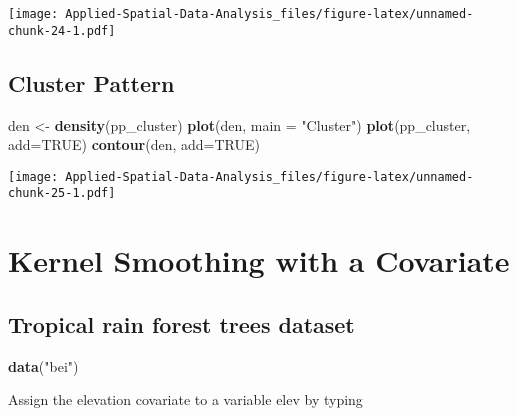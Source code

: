 \documentclass[
]{book}
\newenvironment{Shaded}{\begin{snugshade}}{\end{snugshade}}
\newcommand{\DataTypeTok}[1]{\textcolor[rgb]{0.13,0.29,0.53}{#1}}
\newcommand{\KeywordTok}[1]{\textcolor[rgb]{0.13,0.29,0.53}{\textbf{#1}}}
\newcommand{\NormalTok}[1]{#1}
\newcommand{\OperatorTok}[1]{\textcolor[rgb]{0.81,0.36,0.00}{\textbf{#1}}}
\newcommand{\OtherTok}[1]{\textcolor[rgb]{0.56,0.35,0.01}{#1}}
\newcommand{\StringTok}[1]{\textcolor[rgb]{0.31,0.60,0.02}{#1}}
\begin{document}
\texttt{[image: Applied-Spatial-Data-Analysis\_files/figure-latex/unnamed-chunk-24-1.pdf]}

\hypertarget{cluster-pattern}{%
\subsection{Cluster Pattern}\label{cluster-pattern}}

\begin{Shaded}
\begin{Highlighting}[]
\NormalTok{den <-}\StringTok{ }\KeywordTok{density}\NormalTok{(pp_cluster)}
\KeywordTok{plot}\NormalTok{(den, }\DataTypeTok{main =} \StringTok{"Cluster"}\NormalTok{)}
\KeywordTok{plot}\NormalTok{(pp_cluster, }\DataTypeTok{add=}\OtherTok{TRUE}\NormalTok{)}
\KeywordTok{contour}\NormalTok{(den, }\DataTypeTok{add=}\OtherTok{TRUE}\NormalTok{)}
\end{Highlighting}
\end{Shaded}

\texttt{[image: Applied-Spatial-Data-Analysis\_files/figure-latex/unnamed-chunk-25-1.pdf]}

\hypertarget{kernel-smoothing-with-a-covariate}{%
\section{Kernel Smoothing with a Covariate}\label{kernel-smoothing-with-a-covariate}}

\hypertarget{tropical-rain-forest-trees-dataset}{%
\subsection{Tropical rain forest trees dataset}\label{tropical-rain-forest-trees-dataset}}

\begin{Shaded}
\begin{Highlighting}[]
\KeywordTok{data}\NormalTok{(}\StringTok{"bei"}\NormalTok{)}
\end{Highlighting}
\end{Shaded}

Assign the elevation covariate to a variable elev by typing

\begin{Shaded}
\end{Shaded}
\end{document}

